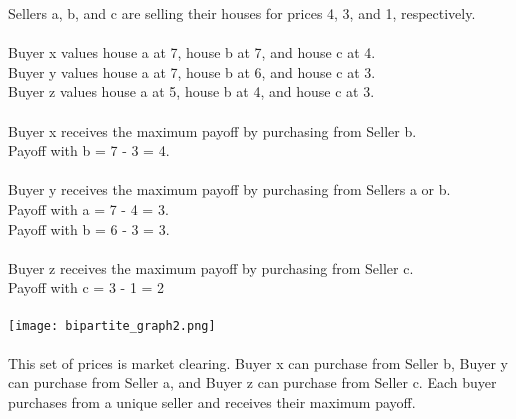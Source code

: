 \documentclass[twoside]{article}
\begin{document}
Sellers a, b, and c are selling their houses for prices 4, 3, and 1, respectively.\\\\
Buyer x values house a at 7, house b at 7, and house c at 4.\\
Buyer y values house a at 7, house b at 6, and house c at 3.\\
Buyer z values house a at 5, house b at 4, and house c at 3.\\
\\
Buyer x receives the maximum payoff by purchasing from Seller b.\\
\indent Payoff with b  = 7 - 3 = 4.\\\\
Buyer y receives the maximum payoff by purchasing from Sellers a or b.\\
\indent Payoff with a = 7 - 4 = 3.\\
\indent Payoff with b = 6 - 3 = 3.\\\\
Buyer z receives the maximum payoff by purchasing from Seller c.\\
\indent Payoff with c = 3 - 1 = 2\\\\
\texttt{[image: bipartite\_graph2.png]}\\\\
This set of prices is market clearing. Buyer x can purchase from Seller b, Buyer y can purchase from Seller a, and Buyer z can purchase from Seller c.  Each buyer purchases from a unique seller and receives their maximum payoff.
\end{document}
